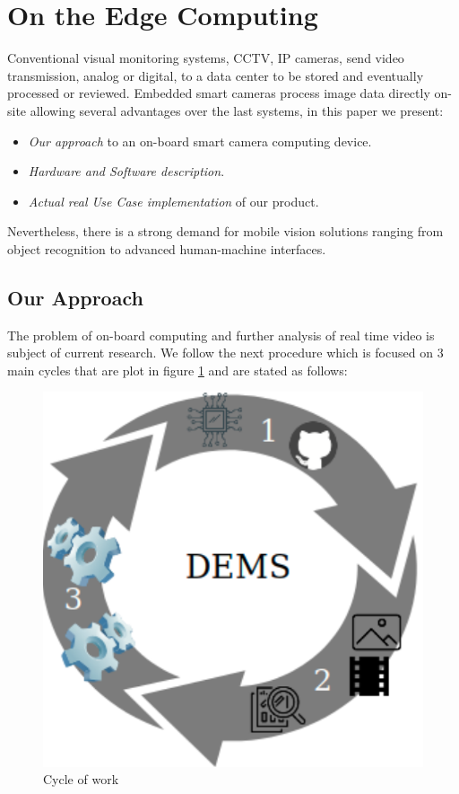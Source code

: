 \documentclass[fleqn,12pt]{SelfArx} %
\begin{document}
\section{On the Edge Computing}

Conventional visual monitoring systems, CCTV, IP cameras, send video transmission, analog or digital, to a data center to be stored and eventually processed or reviewed. Embedded smart cameras process image data directly on-site allowing several advantages over the last systems, in this paper we present:

\begin{itemize}[noitemsep] %
\item \textit{Our approach} to an on-board smart camera computing device.
\item \textit{Hardware and Software description}.
\item \textit{Actual real Use Case implementation} of our product. 
\end{itemize}


Nevertheless, there is a strong demand for mobile vision solutions ranging from object recognition to advanced human-machine interfaces.

\subsection{Our Approach}

The problem of on-board computing and further analysis of real time video is subject of current research. We follow the next procedure which is focused on 3 main cycles that are plot in figure \ref{fig:cycle} and are stated as follows:

\begin{figure}[h]\centering
	\includegraphics[width=0.6\linewidth]{images/cycle}
	\caption{Cycle of work}
	\label{fig:cycle}
\end{figure}
\end{document}
